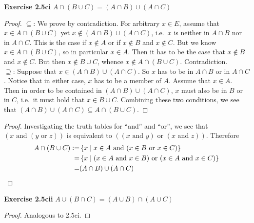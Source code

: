 \documentclass[letterpaper,12pt]{article}
\newcommand{\is}{\ensuremath{\mathrel{\mathop:}=}}
\newcommand{\setof}[1]{\ensuremath{\left \{ #1 \right \}}}
\newcommand{\exercise}[1]{\noindent \textbf{Exercise #1} \quad}
\begin{document}
\exercise{2.5ci} $A \cap (B \cup C) = (A \cap B) \cup (A \cap C)$
\begin{proof}
	$\subseteq$: We prove by contradiction.
	For arbitrary $x \in E$, assume that $x \in A \cap (B \cup C)$ yet $x \notin (A \cap B) \cup (A \cap C)$, i.e.\ $x$ is neither in $A \cap B$ nor in $A \cap C$. This is the case if $x \notin A$ or if $x \notin B$ and $x \notin C$. But we know $x \in A \cap (B \cup C)$, so in particular $x \in A$. Then it has to be the case that $x \notin B$ and $x \notin C$. But then $x \notin B \cup C$, whence $x \notin A \cap (B \cup C)$. Contradiction.\\
	$\supseteq$: Suppose that $x \in (A \cap B) \cup (A \cap C)$. So $x$ has to be in $A \cap B$ or in $A \cap C$. Notice that in either case, $x$ has to be a member of $A$. Assume that $x \in A$. Then in order to be contained in $(A \cap B) \cup (A \cap C)$, $x$ must also be in $B$ or in $C$, i.e.\ it must hold that $x \in B \cup C$. Combining these two conditions, we see that $(A \cap B) \cup (A \cap C) \subseteq A \cap (B \cup C)$.
\end{proof}
%
\begin{proof}
	Investigating the truth tables for ``and'' and ``or'', we see that $(x \text{ and } (y \text{ or } z))$ is equivalent to $((x \text{ and } y) \text{ or } (x \text{ and } z))$. Therefore
	\begin{align*}
	A \cap (B \cup C) \is& \setof{ x \mid x \in A \text{ and } (x \in B \text{ or } x \in C)}\\
			=& \setof{ x \mid (x \in A \text{ and } x \in B) \text{ or } (x \in A \text{ and } x \in C)}\\
			=& (A \cap B) \cup (A \cap C)
	\qedhere
	\end{align*}
\end{proof}


\exercise{2.5cii} $A \cup (B \cap C) = (A \cup B) \cap (A \cup C)$
\begin{proof}
	Analogous to 2.5ci.
\end{proof}
\end{document}
